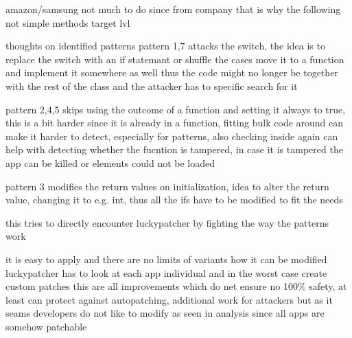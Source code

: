 amazon/samsung not much to do since from company that is why the following not simple methods target lvl\cite{munteanLicense}

thoughts on identified patterns
pattern 1,7 attacks the switch, the idea is to replace the switch with an if statemant or shuffle the cases
move it to a function and implement it somewhere as well thus the code might no longer be together with the rest of the class and the attacker has to specific search for it

pattern 2,4,5 skips using the outcome of a function and setting it always to true, this is a bit harder since it is already in a function, fitting bulk code around can make it harder to detect, especially for patterns, also checking inside again can help with detecting whether the fucntion is tampered, in case it is tampered the app can be killed or elements could not be loaded

pattern 3 modifies the return values on initialization, idea to alter the return value, changing it to e.g. int, thus all the ifs have to be modified to fit the needs


this tries to directly encounter luckypatcher by fighting the way the patterns work

it is easy to apply and there are no limits of variants how it can be modified
luckypatcher has to look at each app individual and in the worst case create custom patches
this are all improvements which do net ensure no 100\% safety, at least can protect against autopatching, additional work for attackers
but as it seams developers do not like to modify as seen in analysis since all apps are somehow patchable
